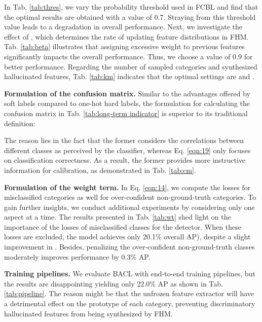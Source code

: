 \documentclass[lettersize,journal]{IEEEtran}
\begin{document}
In Tab. \ref{tab:thres}, we vary the probability threshold  used in FCBL and find that the optimal results are obtained with a value of 0.7.
Straying from this threshold value leads to a degradation in overall performance.
Next, we investigate the effect of , which determines the rate of updating feature distributions in FHM.
Tab. \ref{tab:beta} illustrates that assigning excessive weight to previous features significantly impacts the overall performance. 
Thus, we choose a value of 0.9 for better performance.
Regarding the number of sampled categories and synthesized hallucinated features, Tab. \ref{tab:km} indicates that the optimal settings are  and .

\noindent\textbf{Formulation of the confusion matrix.}
Similar to the advantages offered by soft labels compared to one-hot hard labels, the formulation for calculating the confusion matrix in Tab. \ref{tab:long-term indicator} is superior to its 
traditional definition:

The reason lies in the fact that the former considers the correlations between different classes as perceived by the classifier, whereas Eq. \eqref{eqn:19} only focuses on classification correctness.
As a result, the former provides more instructive information for calibration, as demonstrated in Tab. \ref{tab:cm}.

\noindent\textbf{Formulation of the weight term.}
In Eq. \eqref{eqn:14}, we compute the losses for misclassified categories as well for over-confident non-ground-truth categories.
To gain further insights, we conduct additional experiments by considering only one aspect at a time.
The results presented in Tab. \ref{tab:wt} shed light on the importance of the losses of misclassified classes for the detector.
When these losses are excluded, the model achieves only 20.1\% overall AP), despite a slight improvement in .
Besides, penalizing the over-confident non-ground-truth classes moderately improves performance by 0.3\% AP.

\noindent\textbf{Training pipelines.}
We evaluate BACL with end-to-end training pipelines, but the results are disappointing yielding only 22.0\% AP as shown in Tab. \ref{tab:pipeline}.
The reason might be that the unfrozen feature extractor will have a detrimental effect on the prototype of each category, preventing discriminatory hallucinated features from being synthesized by FHM.
\end{document}
